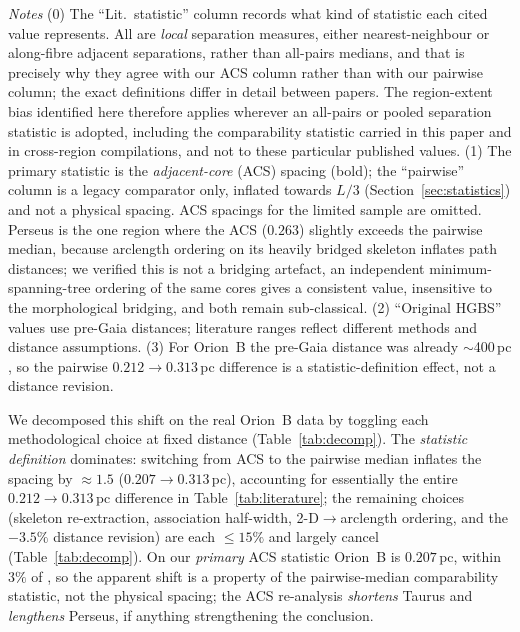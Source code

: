 \documentclass[usenatbib,twoside,twocolumn]{mnras}
\begin{document}
\begin{table}
\vspace{0.1in}
\footnotesize
\emph{Notes} (0) The ``Lit.\ statistic'' column records what kind of statistic each cited value represents. All are \emph{local} separation measures, either nearest-neighbour or along-fibre adjacent separations, rather than all-pairs medians, and that is precisely why they agree with our ACS column rather than with our pairwise column; the exact definitions differ in detail between papers. The region-extent bias identified here therefore applies wherever an all-pairs or pooled separation statistic is adopted, including the comparability statistic carried in this paper and in cross-region compilations, and not to these particular published values. (1) The primary statistic is the \emph{adjacent-core} (ACS) spacing (bold); the ``pairwise'' column is a legacy comparator only, inflated towards $L/3$ (Section~\ref{sec:statistics}) and not a physical spacing. ACS spacings for the limited sample are omitted. Perseus is the one region where the ACS ($0.263$) slightly exceeds the pairwise median, because arclength ordering on its heavily bridged skeleton inflates path distances; we verified this is not a bridging artefact, an independent minimum-spanning-tree ordering of the same cores gives a consistent value, insensitive to the morphological bridging, and both remain sub-classical. (2) ``Original HGBS'' values use pre-Gaia distances; literature ranges reflect different methods and distance assumptions. (3) For Orion~B the pre-Gaia distance was already $\sim$400\,pc \citep{Konyves2020}, so the pairwise $0.212\to0.313$\,pc difference is a statistic-definition effect, not a distance revision.
\end{table}

We decomposed this shift on the real Orion~B data by toggling each methodological choice at fixed distance (Table~\ref{tab:decomp}). The \emph{statistic definition} dominates: switching from ACS to the pairwise median inflates the spacing by $\approx1.5$ ($0.207\to0.313$\,pc), accounting for essentially the entire $0.212\to0.313$\,pc difference in Table~\ref{tab:literature}; the remaining choices (skeleton re-extraction, association half-width, 2-D$\to$arclength ordering, and the $-3.5\%$ distance revision) are each $\le15\%$ and largely cancel (Table~\ref{tab:decomp}). On our \emph{primary} ACS statistic Orion~B is $0.207$\,pc, within $3\%$ of \citet{Konyves2020}, so the apparent shift is a property of the pairwise-median comparability statistic, not the physical spacing; the ACS re-analysis \emph{shortens} Taurus and \emph{lengthens} Perseus, if anything strengthening the conclusion.
\end{document}
